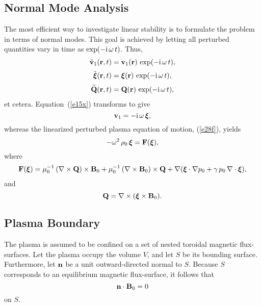 \documentclass[12pt,prb,aps,notitlepage]{revtex4-1}
\newcommand{\bxi}{\mbox{\boldmath$\xi$}}
\begin{document}
\subsection{Normal Mode Analysis}
The most efficient way to investigate linear stability is to formulate 
 the problem in terms of normal modes. This goal is
achieved by letting all perturbed quantities vary in time as $\exp(-{\rm i}\,\omega\,t)$. 
Thus,
\begin{align}
\tilde{\bf v}_1({\bf r},t) &= {\bf v}_1({\bf r})\, \exp(-{\rm i}\,\omega\,t),\\[0.5ex]
\tilde{\bxi}({\bf r},t)&= \bxi({\bf r})\, \exp(-{\rm i}\,\omega\,t),\\[0.5ex]
\widetilde{\bf Q}({\bf r},t) &= {\bf Q}({\bf r})\, \exp(-{\rm i}\,\omega\,t),
\end{align}
et cetera. 
Equation~(\ref{e15x}) transforms to give
\begin{equation}\label{e15}
{\bf v}_1 =-{\rm i}\,\omega\,\bxi,
\end{equation}
whereas the linearized perturbed plasma equation of motion, (\ref{e28f}), yields
\begin{equation}\label{e24a}
-\omega^2\,\rho_0\,\bxi= {\bf F}(\bxi),
\end{equation}
where
\begin{align}\label{e24}
{\bf F}(\bxi) = \mu_0^{-1}\,(\nabla\times {\bf Q})\times{\bf B}_0+ \mu_0^{-1}\, (\nabla\times {\bf B}_0)\times {\bf Q} + 
\nabla(\bxi\cdot \nabla p_0 + \gamma\,p_0\,\nabla\cdot\bxi),
\end{align} 
and
\begin{equation}\label{e25}
{\bf Q} = \nabla\times (\bxi\times {\bf B}_0).
\end{equation}

\subsection{Plasma Boundary}
The plasma is assumed to be confined on a set of nested toroidal magnetic flux-surfaces. 
Let the plasma occupy the volume $V$, and let $S$ be its bounding surface. Furthermore, let ${\bf n}$ be
a unit outward-directed normal to $S$. Because $S$ corresponds to  an equilibrium  magnetic flux-surface, it follows that
\begin{equation}\label{e31x}
{\bf n}\cdot {\bf B}_0=0
\end{equation}
on $S$. 
\end{document}
